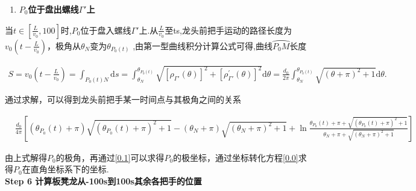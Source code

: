 \documentclass{cumcmthesis}
\begin{document}
\begin{enumerate}[start=4]
    \item \textbf{$P_0$位于盘出螺线$\varGamma'$上}
    \end{enumerate}  
    \par 当$t\in[\frac{L}{v_0},100]$时,$P_0$位于盘入螺线$\varGamma'$上.从$\frac{L}{v_0}$至ts,龙头前把手运动的路径长度为$v_0\left( t-\frac{L}{v_0} \right)$，极角从$\theta _N$变为$\theta _{P_0\left( t \right)} $ ,由第一型曲线积分计算公式可得,曲线$\wideparen{P_0M}$长度
    \begin{small}
    \begin{align}\label{1.........441}
        S=v_0\left( t-\frac{L}{v_0} \right) =\int_{P_0\left( t \right) N}{\mathrm{d}s}=\int_{\theta _N}^{\theta _{P_0\left( t \right)}}{\sqrt{\left[ \rho _{\varGamma \prime}\left( \theta \right) \right] ^2+\left[ \rho _{\varGamma \prime}^{\prime}\left( \theta \right) \right] ^2}\mathrm{d}\theta}=\frac{d_0}{2\pi}\int_{\theta _N}^{\theta _{P_0\left( t \right)}}{\sqrt{\left( \theta +\pi \right) ^2+1}\mathrm{d}\theta }.
    \end{align}
\end{small}
    \par 通过求解，可以得到龙头前把手某一时间点与其极角之间的关系
   \begin{small}
        \begin{align*}\label{1.........442}
        &\frac{d_0}{4\pi}\left[( \theta_{P_0}(t)+\pi)\sqrt{(\theta_{P_0}(t)+\pi)^{2}+1}-(\theta_N+\pi)\sqrt{(\theta_N+\pi)^{2}+1}+\ln\frac{\theta_{P_0}(t)+\pi+\sqrt{(\theta_{P_0}(t)+\pi)^{2}+1}}{\theta_N+\pi+\sqrt{(\theta_N+\pi)^{2}+1}}\right]
        \end{align*}
    \end{small}
    
    \par 由上式解得$P_0$的极角，再通过\eqref{0.1}可以求得$P_0$的极坐标，通过坐标转化方程\eqref{0.0}求得$P_0$在直角坐标系下的坐标.
\\\noindent\textbf{Step 6 计算板凳龙从-100s到100s其余各把手的位置} 
\end{document}
